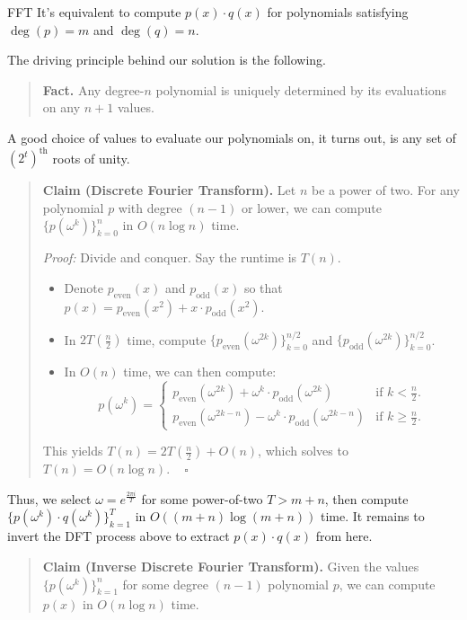 \begin{solution}{FFT}
    It's equivalent to compute $p(x) \cdot q(x)$ for polynomials satisfying $\deg (p) = m$ and $\deg(q) = n$.

    The driving principle behind our solution is the following.
    \begin{quote}
        \textbf{Fact.} Any degree-$n$ polynomial is uniquely determined by its evaluations on any $n + 1$ values.
    \end{quote}
    A good choice of values to evaluate our polynomials on, it turns out, is any set of $(2^t)^{\text{th}}$ roots of unity.
    \begin{quote}
        \textbf{Claim (Discrete Fourier Transform).} Let $n$ be a power of two.  For any polynomial $p$ with degree $(n - 1)$ or lower, we can compute $\{p(\omega^{k}) \}_{k = 0}^n$ in $O(n \log n)$ time.

        \emph{Proof:} Divide and conquer.  Say the runtime is $T(n)$.
        \begin{itemize}
            \item Denote $p_{\text{even}}(x)$ and $p_{\text{odd}}(x)$ so that $p(x) = p_{\text{even}}(x^2) + x \cdot p_{\text{odd}}(x^2)$.
            \item In $2T\left(\frac{n}{2}\right)$ time, compute $\{p_{\text{even}}(\omega^{2k})\}_{k = 0}^{n / 2}$ and $\{p_{\text{odd}}(\omega^{2k})\}_{k = 0}^{n / 2}$.
            \item In $O(n)$ time, we can then compute:
            \[ p(\omega^k) = \begin{cases}
                p_{\text{even}}\left(\omega^{2k}\right) + \omega^k \cdot p_{\text{odd}}\left(\omega^{2k}\right) & \text{if $k < \frac{n}{2}$.} \\
                p_{\text{even}}\left(\omega^{2k - n}\right) - \omega^k \cdot p_{\text{odd}}\left(\omega^{2k - n}\right) & \text{if $k \geq \frac{n}{2}$.}
            \end{cases} \]
        \end{itemize}
        This yields $T(n) = 2T\left(\frac{n}{2}\right) + O(n)$, which solves to $T(n) = O(n \log n)$. ~ $\square$
    \end{quote}
    Thus, we select $\omega = e^{\frac{2\pi i}{T}}$ for some power-of-two $T > m + n$, then compute $\{p(\omega^k) \cdot q(\omega^k)\}_{k = 1}^{T}$ in $O((m + n) \log (m + n))$ time.  It remains to invert the DFT process above to extract $p(x) \cdot q(x)$ from here.
    \begin{quote}
        \textbf{Claim (Inverse Discrete Fourier Transform).} Given the values $\{p(\omega^k)\}_{k = 1}^n$ for some degree $(n - 1)$ polynomial $p$, we can compute $p(x)$ in $O(n \log n)$ time.


\end{quote}
\end{solution}
